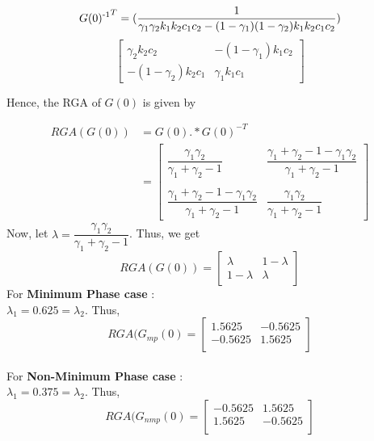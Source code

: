 \documentclass[10pt,a4paper, twocolumn]{article}
\begin{document}
\[
G(0)\textsuperscript{-1}^T =
(\dfrac{1}{\gamma_1 \gamma_2 k_1 k_2 c_1 c_2 - (1-\gamma_1) (1-\gamma_2) k_1 k_2 c_1 c_2})
\]
\[
\begin{bmatrix}
  \gamma_2 k_2 c_2 & -(1-\gamma_1) k_1 c_2 \\
  -(1-\gamma_2)k_2 c_1 & \gamma_1 k_1 c_1
\end{bmatrix}
\]

Hence, the RGA of $G(0)$ is given by

\begin{align*}
  RGA(G(0)) &= G(0) .* G(0)^{-T} \\
   &= 
  \begin{bmatrix}
	\dfrac{\gamma_1 \gamma_2}{\gamma_1 + \gamma_2 - 1}    
    & \dfrac{\gamma_1 + \gamma_2 - 1 - \gamma_1 \gamma_2}{\gamma_1 + \gamma_2 - 1} \\ \\
    \dfrac{\gamma_1 + \gamma_2 - 1 - \gamma_1 \gamma_2}{\gamma_1 + \gamma_2 - 1} & \dfrac{\gamma_1 \gamma_2}{\gamma_1 + \gamma_2 - 1}
  \end{bmatrix}
\end{align*}
Now, let $\lambda = \dfrac{\gamma_1 \gamma_2}{\gamma_1 + \gamma_2 - 1}$. Thus, we get
\[
RGA(G(0)) = 
\begin{bmatrix}
\lambda & 1-\lambda \\
1-\lambda & \lambda
\end{bmatrix}
\]
For \textbf{Minimum Phase case} : \\
$\lambda_1 = 0.625 = \lambda_2$. Thus, 
\[
RGA(G_{mp}(0) =
\begin{bmatrix}
  1.5625 & -0.5625 \\
  -0.5625 & 1.5625 \\
\end{bmatrix}
\] \\
For \textbf{Non-Minimum Phase case} : \\
$\lambda_1 = 0.375 = \lambda_2$. Thus, 
\[
RGA(G_{nmp}(0) =
\begin{bmatrix}
  -0.5625 & 1.5625 \\
  1.5625 & -0.5625 \\
\end{bmatrix}
\] 
\end{document}
